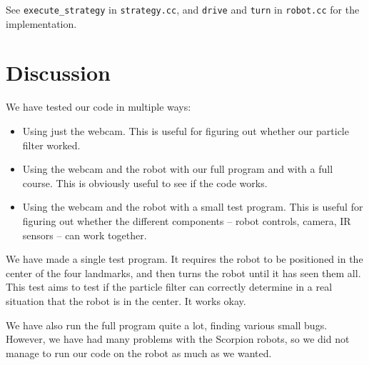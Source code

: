 \documentclass[a4paper,12pt]{article}
\begin{document}
See \texttt{execute_strategy} in \texttt{strategy.cc}, and \texttt{drive} and
\texttt{turn} in \texttt{robot.cc} for the implementation.


\newpage
\section{Discussion}

We have tested our code in multiple ways:

\begin{itemize}
\item Using just the webcam.  This is useful for figuring out whether our
particle filter worked.
\item Using the webcam and the robot with our full program and with a full
course.  This is obviously useful to see if the code works.
\item Using the webcam and the robot with a small test program.  This is useful
for figuring out whether the different components -- robot controls, camera, IR
sensors -- can work together.
\end{itemize}

We have made a single test program.  It requires the robot to be positioned in
the center of the four landmarks, and then turns the robot until it has seen
them all.  This test aims to test if the particle filter can correctly determine
in a real situation that the robot is in the center.  It works okay.

We have also run the full program quite a lot, finding various small bugs.
However, we have had many problems with the Scorpion robots, so we did not
manage to run our code on the robot as much as we wanted.
\end{document}

